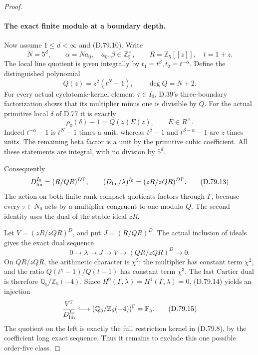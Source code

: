 \begin{proof}
\paragraph{The exact finite module at a boundary depth.}
Now assume \(1\le d<\infty\) and (D.79.10). Write
\[
 N=5^d,\qquad \alpha=N a_0,
 \quad a_0,\beta\in\mathbb Z_5^\times,
 \qquad R=\mathbb Z_5[[z]],\quad t=1+z.
\]
The local line quotient is given integrally by
\(t_1=t^\beta,t_2=t^{-\alpha}\). Define the distinguished
polynomial
\[
 Q(z)=z^2(t^N-1),\qquad \deg Q=N+2.                   \tag{D.79.11}
\]
For every actual cyclotomic-kernel element \(\tau\in I_0\),
D.39's three-boundary factorization shows that its multiplier
minus one is divisible by \(Q\). For the actual primitive
local \(\delta\) of D.77 it is exactly
\[
                   \rho_0(\delta)-1=Q(z)E(z),
                          \qquad E\in R^\times.        \tag{D.79.12}
\]
Indeed \(t^{-\alpha}-1\) is \(t^N-1\) times a unit,
whereas \(t^\beta-1\) and \(t^{\beta-\alpha}-1\)
are \(z\) times units. The remaining beta factor is a unit
by the primitive cubic coefficient. All these statements are
integral, with no division by \(5^d\).

Consequently
\[
 D_{\rm lin}^{I_0}=(R/QR)^D{}^{\Gamma},\qquad
 (D_{\rm lin}/\lambda)^{I_0}
                    =(zR/zQR)^D{}^{\Gamma}.           \tag{D.79.13}
\]
The action on both finite-rank compact quotients factors
through \(\Gamma\), because every \(\tau\in N_0\)
acts by a multiplier congruent to one modulo \(Q\).
The second identity uses the dual of the stable ideal \(zR\).

Let \(V=(zR/zQR)^D\), and put \(J=(R/QR)^D\).
The actual inclusion of ideals gives the exact dual sequence
\[
 0\longrightarrow\lambda\longrightarrow J
       \longrightarrow V
       \longrightarrow (QR/zQR)^D\longrightarrow0.
                                                               \tag{D.79.14}
\]
On \(QR/zQR\), the arithmetic character is \(\chi^5\):
the multiplier has constant term \(\chi^2\), and the
ratio \(Q(t^\chi-1)/Q(t-1)\) has constant term \(\chi^3\).
The last Cartier dual is therefore
\(\mathbb Q_5/\mathbb Z_5(-4)\). Since
\(H^0(\Gamma,\lambda)=H^1(\Gamma,\lambda)=0\),
(D.79.14) yields an injection
\[
 \frac{V^\Gamma}{D_{\rm lin}^{I_0}}
       \lhook\joinrel\longrightarrow
 (\mathbb Q_5/\mathbb Z_5(-4))^\Gamma
                    =\mathbb F_5.                    \tag{D.79.15}
\]
The quotient on the left is exactly the full restriction
kernel in (D.79.8), by the coefficient long exact sequence.
Thus it remains to exclude this one possible order-five class.


\end{proof}
